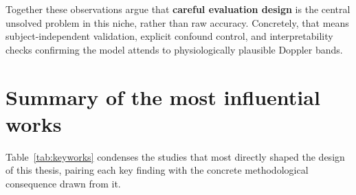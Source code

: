 \noindent Together these observations argue that \textbf{careful evaluation design} is
the central unsolved problem in this niche, rather than raw accuracy. Concretely,
that means subject-independent validation, explicit confound control, and
interpretability checks confirming the model attends to physiologically plausible
Doppler bands.

\section{Summary of the most influential works}
\label{sec:keyworks}

Table~\ref{tab:keyworks} condenses the studies that most directly shaped the
design of this thesis, pairing each key finding with the concrete methodological
consequence drawn from it.

